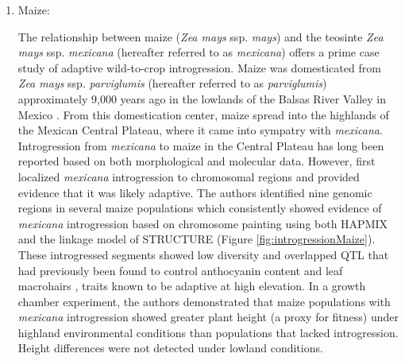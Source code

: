 \documentclass[11pt]{article}
\begin{document}
\begin{enumerate}
\item{Maize:}






The relationship between maize (\emph{Zea mays} ssp. \emph{mays}) and the teosinte \emph{Zea mays} ssp. \emph{mexicana} (hereafter referred to as \emph{mexicana}) offers a prime case study of adaptive wild-to-crop introgression.
Maize was domesticated from \emph{Zea mays} ssp. \emph{parviglumis} (hereafter referred to as \emph{parviglumis})  approximately 9,000 years ago in the lowlands of the Balsas River Valley in Mexico \cite{matsuoka2002single}.
From this domestication center, maize spread into the highlands of the Mexican Central Plateau, where it came into sympatry with \emph{mexicana}.
Introgression from \emph{mexicana} to maize in the Central Plateau has long been reported based on both morphological \cite {wilkes1977, lauter2004, doebley1984} and molecular \cite{matsuoka2002single, vanHeerwaarden2011, doebley1987, warburton2011, fukunaga2005} data.
However, \citep{hufford2013} first localized \emph{mexicana} introgression to chromosomal regions and provided evidence that it was likely adaptive.
The authors identified nine genomic regions in several maize populations which consistently showed evidence of \emph{mexicana} introgression based on chromosome painting using both HAPMIX and the linkage model of STRUCTURE (Figure \ref{fig:introgressionMaize}).
These introgressed segments showed low diversity and overlapped QTL that had previously been found to control anthocyanin content and leaf macrohairs \cite{lauter2004}, traits known to be adaptive at high elevation.
In a growth chamber experiment, the authors demonstrated that maize populations with \emph{mexicana} introgression showed greater plant height (a proxy for fitness) under highland environmental conditions than populations that lacked introgression.
Height differences were not detected under lowland conditions.



\end{enumerate}
\end{document}
